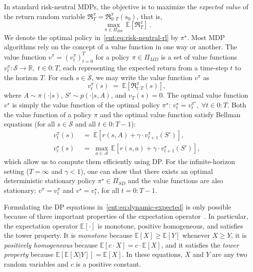 \documentclass[twoside]{article}
\newcommand{\E}{\mathbb{E}}
\newcommand{\states}{\mathcal{S}}
\newcommand{\actions}{\mathcal{A}}
\newcommand{\opt}{^\star}
\newcommand{\Real}{\mathbb{R}}
\theoremstyle{plain}
\theoremstyle{definition}
\theoremstyle{remark}
\renewcommand{\cite}[1]{\citep{#1}}
\begin{document}
In standard risk-neutral MDPs, the objective is to maximize the \emph{expected value} of the return random variable $\mathfrak{R}_T^{\pi}= \mathfrak{R}_{0{:}T}^{\pi}(s_0)$, that is,
%
\begin{equation} \label{ent:eq:risk-neutral-rl}
\max_{\pi \in \Pi_{HR}} \, \E \left[  \mathfrak{R}^{\pi}_T \right] ~.
\end{equation}
%
We denote the optimal policy in~\eqref{ent:eq:risk-neutral-rl} by $\pi\opt$. Most MDP algorithms rely on the concept of a value function in one way or another. The value function $v^{\pi}=(v^\pi_t)_{t=0}^T$ for a policy $\pi\in \Pi_{MD}$ is a set of value functions $v^\pi_t\colon \states \to \Real,\;t \in 0{:}T$, each representing the expected return from a time-step $t$ to the horizon $T$. For each $s\in\states$, we may write the value function $v^\pi$ as
%
\begin{equation}\label{ent:eq:v-pi}
v_t^{\pi}(s) \;=\; \E \left[\mathfrak{R}_{t{:}T}^{\pi}(s) \right],
\end{equation}
%
where $A\sim\pi(\cdot|s)$, $S'\sim p(\cdot|s,A)$, and $v_T(s) =  0$. The optimal value function $v\opt$ is simply the value function of the optimal policy $\pi^\star$: $v\opt_t = v^{\pi\opt}_t,\;\forall t \in 0{:}T$. 
Both the value function of a policy $\pi$ and the optimal value function satisfy Bellman equations (for all $s\in \states$ and all $t\in 0{:}T{-}1$): 
%
\begin{equation}
\label{ent:eq:dynamic-expected}
\begin{aligned} 
  v_t^{\pi}(s) &\;=\; \E \left[r(s,A) + \gamma\cdot v_{t+1}^{\pi}(S') \right], \\
  v\opt_t(s)  &\; =\;  \max_{a\in \actions}\,  \E \left[r(s,a) + \gamma \cdot  v_{t+1}\opt(S') \right],
\end{aligned}
\end{equation}
%
which allow us to compute them efficiently using DP. For the infinite-horizon setting ($T=\infty$ and $\gamma < 1$), one can show that there exists an optimal deterministic stationary policy $\pi\opt \in \Pi_{SD}$ and the value functions are also stationary:  $v^\pi = v^\pi_t$ and $v\opt = v\opt_t$, for all $t = 0{:}T{-}1$.

Formulating the DP equations in~\eqref{ent:eq:dynamic-expected} is only possible because of three important properties of the expectation operator~\cite{Puterman2005,Shapiro2014}. In particular, the expectation operator $\mathbb E[\cdot]$ is monotone, positive homogeneous, and satisfies the tower property. It is \emph{monotone} because $\E[X] \ge \E[Y]$ whenever $X \ge Y$, it is \emph{positively homogeneous} because $\E[c\cdot X] = c\cdot\E[X]$, and it satisfies the \emph{tower property} because $\E[\E[X|Y]] = \E[X]$. In these equations, $X$ and $Y$ are any two random variables and $c$ is a positive constant.
\end{document}
